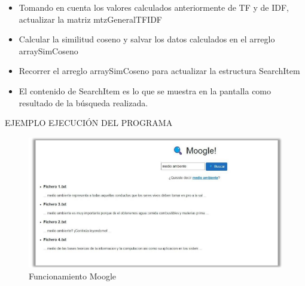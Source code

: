 \documentclass[11pt]{beamer}
\begin{document}
\begin{frame}
\begin{itemize}
\item Tomando en cuenta los valores calculados anteriormente de TF y de IDF, actualizar la 
matriz mtzGeneralTFIDF\\

\item Calcular la similitud coseno y salvar los datos calculados en el arreglo arraySimCoseno\\

\item Recorrer el arreglo arraySimCoseno para actualizar la estructura SearchItem\\

\item El contenido de SearchItem es lo que se muestra en la pantalla como resultado de la 
búsqueda realizada.\\
\end{itemize}
\end{frame}

\begin{frame}
EJEMPLO EJECUCIÓN DEL PROGRAMA
\begin{figure}[h]
	\centering
	\includegraphics{mooglePaint.png}
	\caption{Funcionamiento Moogle}
\end{figure}
\end{frame}
\end{document}
